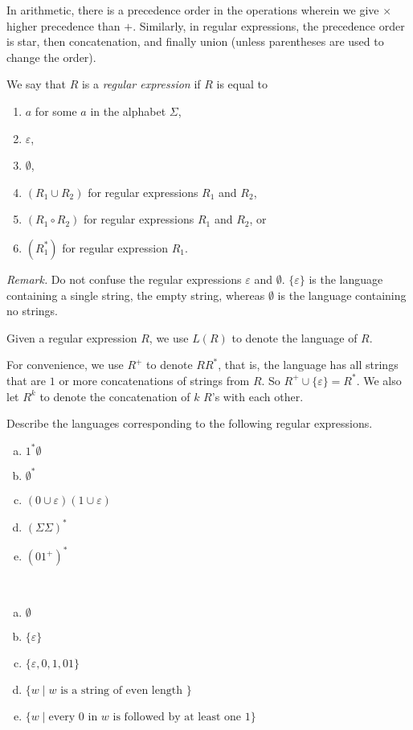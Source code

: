 In arithmetic, there is a precedence order in the operations wherein we give $\times$ higher precedence than $+$. Similarly, in regular expressions, the precedence order is star, then concatenation, and finally union (unless parentheses are used to change the order).

\begin{definition}
We say that $R$ is a \textit{regular expression} if $R$ is equal to
\begin{enumerate}
	\item $a$ for some $a$ in the alphabet $\Sigma$,
	\item $\varepsilon$,
	\item $\emptyset$,
	\item $(R_1\cup R_2)$ for regular expressions $R_1$ and $R_2$,
	\item $(R_1\circ R_2)$ for regular expressions $R_1$ and $R_2$, or
	\item $(R_1^*)$ for regular expression $R_1$.
\end{enumerate}
\end{definition}


\textit{Remark.} Do not confuse the regular expressions $\varepsilon$ and $\emptyset$. $\{\varepsilon\}$ is the language containing a single string, the empty string, whereas $\emptyset$ is the language containing no strings.

\vspace{2mm}
Given a regular expression $R$, we use $L(R)$ to denote the language of $R$.

For convenience, we use $R^+$ to denote $RR^*$, that is, the language has all strings that are $1$ or more concatenations of strings from $R$. So $R^+\cup\{\varepsilon\}=R^*$. We also let $R^k$ to denote the concatenation of $k$ $R$'s  with each other.

\begin{exercise}
Describe the languages corresponding to the following regular expressions.
\begin{enumerate}[(a)]
	\item $1^*\emptyset$
	\item $\emptyset^*$
	\item $(0\cup\varepsilon)(1\cup\varepsilon)$
	\item $(\Sigma\Sigma)^*$
	\item $(01^+)^*$
\end{enumerate}
\end{exercise}
\begin{solution}
~
\begin{enumerate}[(a)]
	\item $\emptyset$
	\item $\{\varepsilon\}$
	\item $\{\varepsilon,0,1,01\}$
	\item $\{w\mid w\text{ is a string of even length }\}$
	\item $\{w\mid \text{every $0$ in $w$ is followed by at least one $1$}\}$
\end{enumerate}
\end{solution}

